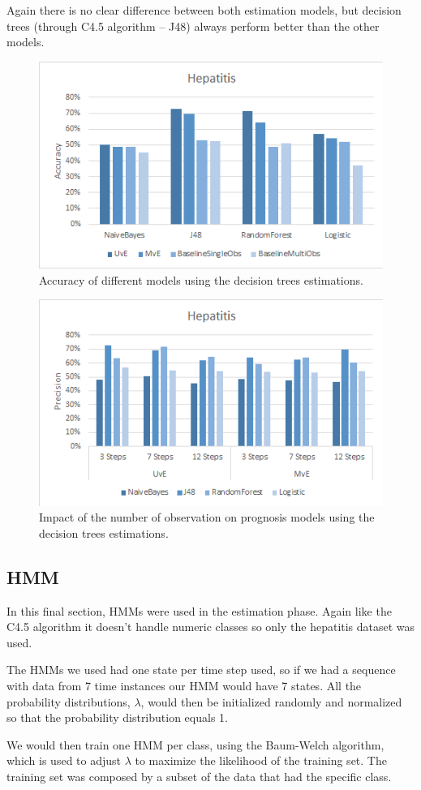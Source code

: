 Again there is no clear difference between both estimation models, but decision trees (through C4.5 algorithm – J48) always 
perform better than the other models. 

\begin{figure}[h]
	\centering
  \includegraphics[width=0.49\linewidth]{Figures/accuracy_h_tree.png}
  \caption{Accuracy of different models using the decision trees estimations.}
  \label{fig:accuracytree}
\end{figure}

 \begin{figure}[h]
	\centering
	\includegraphics[width=0.49\linewidth]{Figures/impact_h_tree.png}
  \caption{Impact of the number of observation on prognosis models using the decision trees estimations.}
  \label{fig:impactobservationstree}
\end{figure}

\subsection{HMM}
\label{subsection:hmm}

In this final section, HMMs were used in the estimation phase. Again like the C4.5 algorithm it doesn't handle
numeric classes so only the hepatitis dataset was used.

The HMMs we used had one state per time step used, so if we had a sequence with data from 7 time instances our HMM 
would have 7 states. All the probability distributions, $\lambda$, would then be initialized randomly and normalized 
so that the probability distribution equals 1.

We would then train one HMM per class, using the Baum-Welch algorithm, which is used to adjust $\lambda$ to maximize the 
likelihood of the training set. The training set was composed by a subset of the data that had the specific class. 

